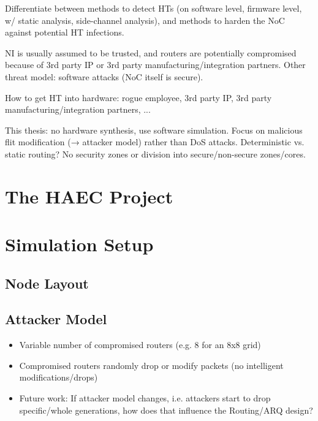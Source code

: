 \documentclass[
	paper=a4,
	fontsize=11pt,
	parskip=full %
]{scrreprt}
\begin{document}
    Differentiate between methods to detect HTs (on software level, firmware level, w/ static analysis, side-channel analysis), and methods to harden
    the NoC against potential HT infections.

    NI is usually assumed to be trusted, and routers are potentially compromised because of 3rd party IP or 3rd party manufacturing/integration
    partners. Other threat model: software attacks (NoC itself is secure).

    How to get HT into hardware: rogue employee, 3rd party IP, 3rd party manufacturing/integration partners, ...

    This thesis: no hardware synthesis, use software simulation. Focus on malicious flit modification (→ attacker model) rather than DoS attacks.
    Deterministic vs. static routing? No security zones or division into secure/non-secure zones/cores.

    \chapter{The HAEC Project}

    \chapter{Simulation Setup}
    \section{Node Layout}

    \section{Attacker Model}
    \begin{itemize}
        \item Variable number of compromised routers (e.g. 8 for an 8x8 grid)
        \item Compromised routers randomly drop or modify packets (no intelligent modifications/drops)
        \item Future work: If attacker model changes, i.e. attackers start to drop specific/whole generations,
            how does that influence the Routing/ARQ design?
    \end{itemize}
\end{document}
